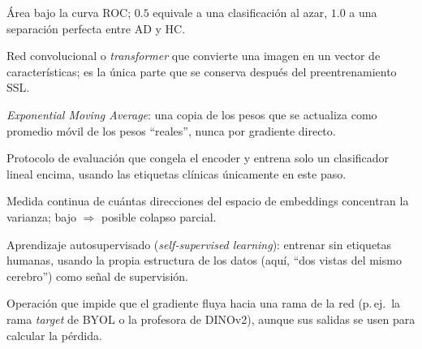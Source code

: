 \documentclass[11pt,a4paper]{article}
\begin{document}
\begin{description}[leftmargin=3.2cm,style=nextline]
\item[AUROC] Área bajo la curva ROC; $0.5$ equivale a una clasificación al
  azar, $1.0$ a una separación perfecta entre AD y HC.
\item[Backbone / encoder] Red convolucional o \emph{transformer} que
  convierte una imagen en un vector de características; es la única parte
  que se conserva después del preentrenamiento SSL.
\item[EMA] \emph{Exponential Moving Average}: una copia de los pesos que se
  actualiza como promedio móvil de los pesos ``reales'', nunca por
  gradiente directo.
\item[\emph{Frozen probe}] Protocolo de evaluación que congela el encoder y
  entrena solo un clasificador lineal encima, usando las etiquetas
  clínicas únicamente en este paso.
\item[\emph{Rango efectivo} (\emph{effective rank})] Medida continua de
  cuántas direcciones del espacio de embeddings concentran la varianza;
  bajo $\Rightarrow$ posible colapso parcial.
\item[SSL] Aprendizaje autosupervisado (\emph{self-supervised learning}):
  entrenar sin etiquetas humanas, usando la propia estructura de los datos
  (aquí, ``dos vistas del mismo cerebro'') como señal de supervisión.
\item[\emph{Stop-gradient}] Operación que impide que el gradiente fluya
  hacia una rama de la red (p.\,ej.\ la rama \emph{target} de BYOL o la
  profesora de DINOv2), aunque sus salidas se usen para calcular la
  pérdida.
\end{description}
\end{document}
